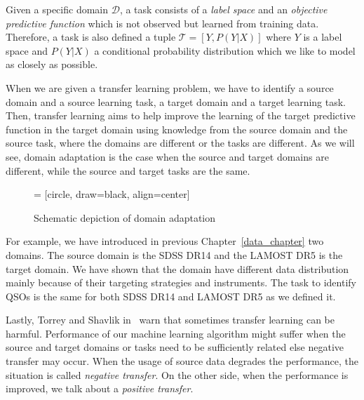 Given a specific domain \(\mathcal{D}\),
a task consists of a \textit{label space} and an \textit{objective predictive function}
which is not observed but learned from training data.
Therefore, a task is also defined a tuple \(\mathcal{T} = [Y, P(Y | X)]\)
where \(Y\) is a label space
and \(P(Y | X)\) a conditional probability distribution
which we like to model as closely as possible.

When we are given a transfer learning problem,
we have to identify a source domain and a source learning task,
a target domain and a target learning task.
Then, transfer learning aims to help improve the learning of the target predictive function in the target domain
using knowledge from the source domain and the source task,
where the domains are different or the tasks are different.
As we will see, domain adaptation is the case
when the source and target domains are different,
while the source and target tasks are the same.~\cite{pan2010}

\begin{figure}
\begin{center}
 = [circle, draw=black, align=center]
\end{center}
\caption{Schematic depiction of domain adaptation}
\end{figure}

For example, we have introduced in previous Chapter~\ref{data_chapter}
two domains.
The source domain is the SDSS DR14 and the LAMOST DR5 is the target domain.
We have shown that the domain have different data distribution
mainly because of their targeting strategies and instruments.
The task to identify QSOs is the same for both SDSS DR14 and LAMOST DR5
as we defined it.

Lastly, Torrey and Shavlik in~\cite{torrey2010} warn
that sometimes transfer learning can be harmful.
Performance of our machine learning algorithm might suffer
when the source and target domains or tasks need to be sufficiently related
else negative transfer may occur.
When the usage of source data degrades the performance,
the situation is called \textit{negative transfer}.
On the other side, when the performance is improved,
we talk about a \textit{positive transfer}.

